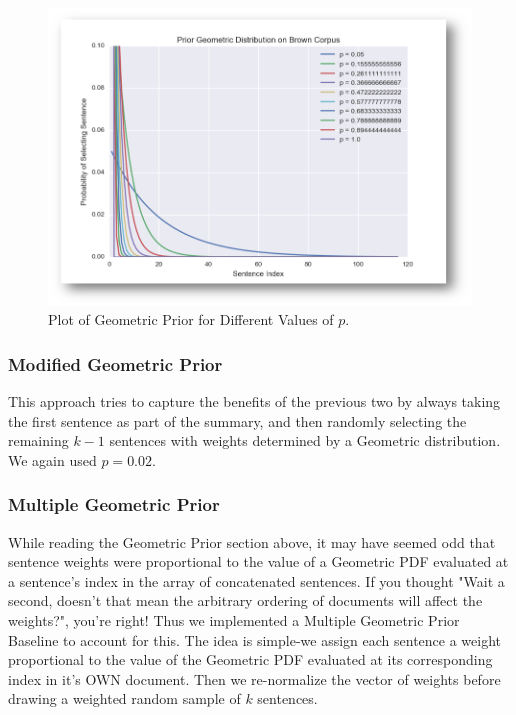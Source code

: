 \documentclass[10pt]{article}
\begin{document}
\begin{figure}[h!]
\centering
\includegraphics[scale=0.4]{geom_prior}
\caption{Plot of Geometric Prior for Different Values of $p$.}
\label{fig:geom_prior}
\end{figure}

\subsubsection{Modified Geometric Prior}
This approach tries to capture the benefits of the previous two by always taking the first sentence as part of the summary, and then randomly selecting the remaining $k-1$ sentences with weights determined by a Geometric distribution. We again used $p = 0.02$.

\subsubsection{Multiple Geometric Prior}
While reading the Geometric Prior section above, it may have seemed odd that sentence weights were proportional to the value of a Geometric PDF evaluated at a sentence's index in the array of concatenated sentences. If you thought "Wait a second, doesn't that mean the arbitrary ordering of documents will affect the weights?", you're right! Thus we implemented a Multiple Geometric Prior Baseline to account for this. The idea is simple-we assign each sentence a weight proportional to the value of the Geometric PDF evaluated at its corresponding index in it's OWN document. Then we re-normalize the vector of weights before drawing a weighted random sample of $k$ sentences.
\end{document}
